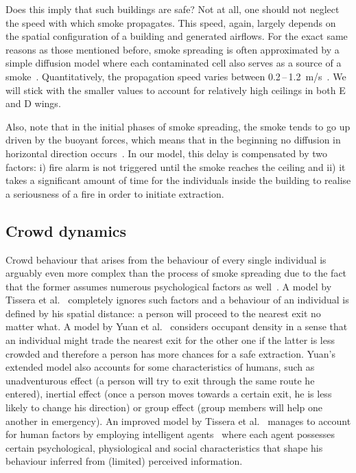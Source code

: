 Does this imply that such buildings are safe?
Not at all, one should not neglect the speed with which smoke propagates.
This speed, again, largely depends on the spatial configuration of a building
and generated airflows.
For the exact same reasons as those mentioned before, smoke spreading is often
approximated by a simple diffusion model where each contaminated cell also
serves as a source of a smoke~\cite{Tissera1, Tissera2}.
Quantitatively, the propagation speed varies between 0.2\,--\,1.2~m/s~\cite{Smoke}.
We will stick with the smaller values to account for relatively high ceilings in
both E and D wings.

Also, note that in the initial phases of smoke spreading, the smoke tends to go
up driven by the buoyant forces, which means that in the beginning no diffusion
in horizontal direction occurs~\cite{Curiac}.
In our model, this delay is compensated by two factors: i) fire alarm is not
triggered until the smoke reaches the ceiling and ii) it takes a significant
amount of time for the individuals inside the building to realise a
seriousness of a fire in order to initiate extraction.

\subsection{Crowd dynamics}
Crowd behaviour that arises from the behaviour of every single individual is
arguably even more complex than the process of smoke spreading due to the fact
that the former assumes numerous psychological factors as well~\cite{Ying, Yuan}.
A model by Tissera et al.~\cite{Tissera1} completely ignores such factors and a
behaviour of an individual is defined by his spatial distance: a person will
proceed to the nearest exit no matter what.
A model by Yuan et al.~\cite{Yuan} considers occupant density in a sense
that an individual might trade the nearest exit for the other one if the latter
is less crowded and therefore a person has more chances for a safe extraction.
Yuan's extended model also accounts for some characteristics of humans,
such as unadventurous effect (a person will try to exit through the same route
he entered), inertial effect (once a person moves towards a certain exit, he is
less likely to change his direction) or group effect (group members will help
one another in emergency).
An improved model by Tissera et al.~\cite{Tissera2} manages to account for human
factors by employing intelligent agents~\cite{AI} where each agent possesses
certain psychological, physiological and social characteristics that shape his
behaviour inferred from (limited) perceived information.

